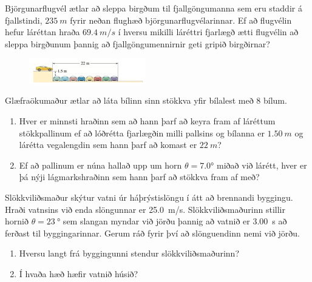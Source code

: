 \begin{enumerate}[label = \textbf{Dæmi \thechapter.\arabic*.}]
\begin{minipage}{\linewidth}
\item Björgunarflugvél ætlar að sleppa birgðum til fjallgöngumanna sem eru staddir á fjallstindi, $\SI{235}{m}$ fyrir neðan flughæð björgunarflugvélarinnar. Ef að flugvélin hefur láréttan hraða $\SI{69.4}{m/s}$ í hversu mikilli láréttri fjarlægð ætti flugvélin að sleppa birgðunum þannig að fjallgöngumennirnir geti gripið birgðirnar?

\end{minipage}

\vspace{1cm}

\begin{minipage}{\linewidth}
\vspace{-1cm}
\begin{figure}
\includegraphics[width=2in]{images/bilalest.png}
\end{figure}

\item Glæfraökumaður ætlar að láta bílinn sinn stökkva yfir bílalest með $8$ bílum.
\begin{enumerate}[label = \textbf{(\alph*)}]
    \item Hver er minnsti hraðinn sem að hann þarf að keyra fram af láréttum stökkpallinum ef að lóðrétta fjarlægðin milli pallsins og bílanna er $\SI{1.50}{m}$ og lárétta vegalengdin sem hann þarf að komast er $\SI{22}{m}$?
    \item Ef að pallinum er núna hallað upp um horn $\theta = \ang{7.0}$ miðað við lárétt, hver er þá nýji lágmarkshraðinn sem hann þarf að stökkva fram af með?
\end{enumerate}

\end{minipage}

\item Slökkviliðsmaður skýtur vatni úr háþrýstislöngu í átt að brennandi byggingu. Hraði vatnsins við enda slöngunnar er \SI{25,0}{m/s}. Slökkviliðsmaðurinn stillir hornið $\theta = \SI{23}{\degree}$ sem slangan myndar við jörðu þannig að vatnið er \SI{3.00}{s} að ferðast til byggingarinnar. Gerum ráð fyrir því að slönguendinn nemi við jörðu.
\begin{enumerate}[label = \textbf{(\alph*)}]
    \item Hversu langt frá byggingunni stendur slökkviliðsmaðurinn?
\item Í hvaða hæð hæfir vatnið húsið?
\end{enumerate}


\end{enumerate}
